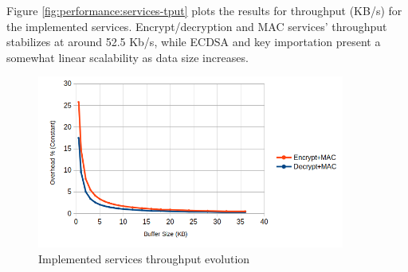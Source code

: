Figure \ref{fig:performance:services-tput} plots the results for throughput (KB/s) for the implemented services.
Encrypt/decryption and MAC services' throughput stabilizes at around 52.5 Kb/s, while \ac{ECDSA} and key importation present a somewhat linear scalability as data size increases.

\begin{figure}[h!]
	\centering
	\includegraphics[width=0.9\textwidth]{./Images/buffer-overhead.png}
	\caption{Implemented services throughput evolution}
	\label{fig:performance:buffer-overhead}
\end{figure}




